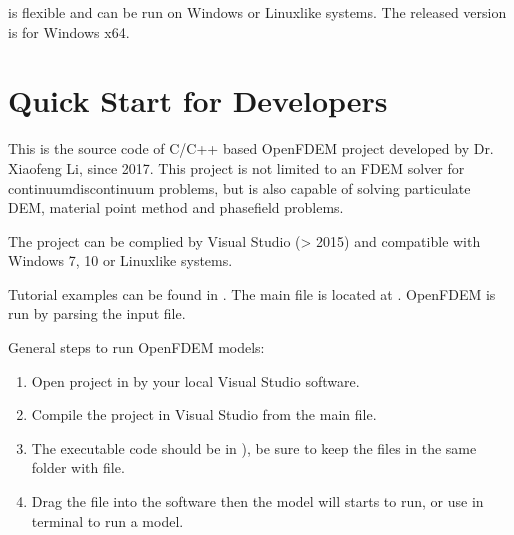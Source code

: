 \documentclass[letterpaper,10pt,english]{sphinxmanual}
\begin{document}
 is flexible and can be run on Windows or Linux\sphinxhyphen{}like systems. The released version is for Windows x64.


\chapter{Quick Start for Developers}
\label{\detokenize{rst_about_project/started:quick-start-for-developers}}\label{\detokenize{rst_about_project/started::doc}}
This is the source code of C/C++ based OpenFDEM project developed by Dr. Xiaofeng Li,
since 2017. This project is not limited to an FDEM solver for continuum\sphinxhyphen{}discontinuum problems,
but is also capable of solving particulate DEM, material point method and phasefield problems.

The project can be complied by Visual Studio (\textgreater{} 2015) and compatible with Windows 7, 10 or Linux\sphinxhyphen{}like systems.

Tutorial examples can be found in . The main file is located at . OpenFDEM is run by
parsing the input file.

General steps to run OpenFDEM models:
\begin{enumerate}
%
\item {} 
Open  project in  by your local Visual Studio software.

\item {} 
Compile the project in Visual Studio  from the  main file.

\item {} 
The executable code should be in ), be sure to keep the  files in the same folder with  file.

\item {} 
Drag the  file into the  software then the model will starts to run, or use  in terminal to run a model.

\end{enumerate}
\end{document}
